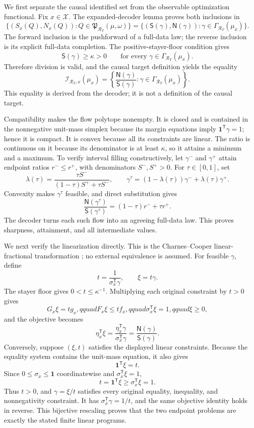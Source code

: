 We first separate the causal identified set from the observable optimization functional.  Fix \(x\in\mathcal X\).  The expanded-decoder lemma proves both inclusions in
\[
 \{(S_x(Q),N_x(Q)):Q\in\mathfrak P_{\mathcal R_T}(\mu,\omega)\}
 =\{(\mathsf S(\gamma),\mathsf N(\gamma)):
 \gamma\in\Gamma_{\mathcal R_T}(\mu_x)\}.
\]
The forward inclusion is the pushforward of a full-data law; the reverse inclusion is its explicit full-data completion.  The positive-stayer-floor condition gives
\[
 \mathsf S(\gamma)\ge\kappa>0
 \qquad
 \text{for every }\gamma\in\Gamma_{\mathcal R_T}(\mu_x).
\]
Therefore division is valid, and the causal target definition yields the equality
\[
 \mathcal I_{\mathcal R_T,x}(\mu_x)
 =\left\{
 \frac{\mathsf N(\gamma)}{\mathsf S(\gamma)}:
 \gamma\in\Gamma_{\mathcal R_T}(\mu_x)
 \right\}.
\]
This equality is derived from the decoder; it is not a definition of the causal target.

Compatibility makes the flow polytope nonempty.  It is closed and is contained in the nonnegative unit-mass simplex because its margin equations imply \(\mathbf 1^{\mathsf T}\gamma=1\); hence it is compact.  It is convex because all its constraints are linear.  The ratio is continuous on it because its denominator is at least \(\kappa\), so it attains a minimum and a maximum.  To verify interval filling constructively, let \(\gamma^-\) and \(\gamma^+\) attain endpoint ratios \(r^-\le r^+\), with denominators \(S^-,S^+>0\).  For \(\tau\in[0,1]\), set
\[
 \lambda(\tau)=
 \frac{\tau S^-}{(1-\tau)S^++\tau S^-},
 \qquad
 \gamma^{\tau}=(1-\lambda(\tau))\gamma^-+
 \lambda(\tau)\gamma^+.
\]
Convexity makes \(\gamma^{\tau}\) feasible, and direct substitution gives
\[
 \frac{\mathsf N(\gamma^{\tau})}{\mathsf S(\gamma^{\tau})}
 =(1-\tau)r^-+\tau r^+.
\]
The decoder turns each such flow into an agreeing full-data law.  This proves sharpness, attainment, and all intermediate values.

We next verify the linearization directly.  This is the Charnes--Cooper linear-fractional transformation \cite{CharnesCooper1962}; no external equivalence is assumed.  For feasible \(\gamma\), define
\[
 t=\frac{1}{\sigma_x^{\mathsf T}\gamma},
 \qquad
 \xi=t\gamma.
\]
The stayer floor gives \(0<t\le\kappa^{-1}\).  Multiplying each original constraint by \(t>0\) gives
\[
 G_x\xi=tg_x,qquad
 F_x\xi\le tf_x,qquad
 \sigma_x^{\mathsf T}\xi=1,qquad
 \xi\ge0,
\]
and the objective becomes
\[
 \eta_x^{\mathsf T}\xi
 =\frac{\eta_x^{\mathsf T}\gamma}
 {\sigma_x^{\mathsf T}\gamma}
 =\frac{\mathsf N(\gamma)}{\mathsf S(\gamma)}.
\]
Conversely, suppose \((\xi,t)\) satisfies the displayed linear constraints.  Because the equality system contains the unit-mass equation, it also gives
\[
 \mathbf 1^{\mathsf T}\xi=t.
\]
Since \(0\le\sigma_x\le\mathbf 1\) coordinatewise and \(\sigma_x^{\mathsf T}\xi=1\),
\[
 t=\mathbf 1^{\mathsf T}\xi
 \ge\sigma_x^{\mathsf T}\xi=1.
\]
Thus \(t>0\), and \(\gamma=\xi/t\) satisfies every original equality, inequality, and nonnegativity constraint.  It has \(\sigma_x^{\mathsf T}\gamma=1/t\), and the same objective identity holds in reverse.  This bijective rescaling proves that the two endpoint problems are exactly the stated finite linear programs.

